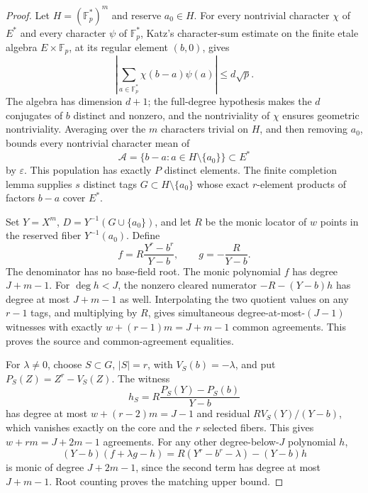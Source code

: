 \begin{proof}
Let $H=(\mathbb F_p^*)^m$ and reserve $a_0\in H$.
For every nontrivial character $\chi$ of $E^*$ and every character
$\psi$ of $\mathbb F_p^*$, Katz's character-sum estimate on the
finite etale algebra $E\times\mathbb F_p$, at its regular element
$(b,0)$, gives~\cite[Theorem~2 and its proof]{katz1989-character-sums}
\[
 \left|\sum_{a\in\mathbb F_p^*}\chi(b-a)\psi(a)\right|
 \le d\sqrt p
 .
\]
The algebra has dimension $d+1$; the full-degree hypothesis makes the
$d$ conjugates of $b$ distinct and nonzero, and the nontriviality of
$\chi$ ensures geometric nontriviality.  Averaging over the $m$
characters trivial on $H$, and then removing $a_0$, bounds every
nontrivial character mean of
\[
 \mathcal A=\{b-a:a\in H\setminus\{a_0\}\}\subset E^*
\]
by $\varepsilon$.  This population has exactly $P$ distinct elements.
The finite completion lemma supplies $s$ distinct tags
$G\subset H\setminus\{a_0\}$ whose exact $r$-element products
of factors $b-a$ cover $E^*$.

Set $Y=X^m$, $D=Y^{-1}(G\cup\{a_0\})$, and let $R$ be the monic
locator of $w$ points in the reserved fiber $Y^{-1}(a_0)$.
Define
\[
 f=R\frac{Y^r-b^r}{Y-b},\qquad g=-\frac R{Y-b}.
\]
The denominator has no base-field root.  The monic polynomial $f$
has degree $J+m-1$.  For $\deg h<J$, the nonzero cleared numerator
$-R-(Y-b)h$ has degree at most $J+m-1$ as well.  Interpolating the
two quotient values on any $r-1$ tags, and multiplying by $R$,
gives simultaneous degree-at-most-$(J-1)$ witnesses with exactly
$w+(r-1)m=J+m-1$ common agreements.  This proves the source and
common-agreement equalities.

For $\lambda\ne0$, choose $S\subset G$, $|S|=r$, with
$V_S(b)=-\lambda$, and put $P_S(Z)=Z^r-V_S(Z)$.
The witness
\[
 h_S=R\frac{P_S(Y)-P_S(b)}{Y-b}
\]
has degree at most $w+(r-2)m=J-1$ and residual
$RV_S(Y)/(Y-b)$, which vanishes exactly on the core and the $r$
selected fibers.  This gives $w+rm=J+2m-1$ agreements.
For any other degree-below-$J$ polynomial $h$,
\[
 (Y-b)(f+\lambda g-h)
 =R(Y^r-b^r-\lambda)-(Y-b)h
\]
is monic of degree $J+2m-1$, since the second term has degree at
most $J+m-1$.  Root counting proves the matching upper bound.
\end{proof}

